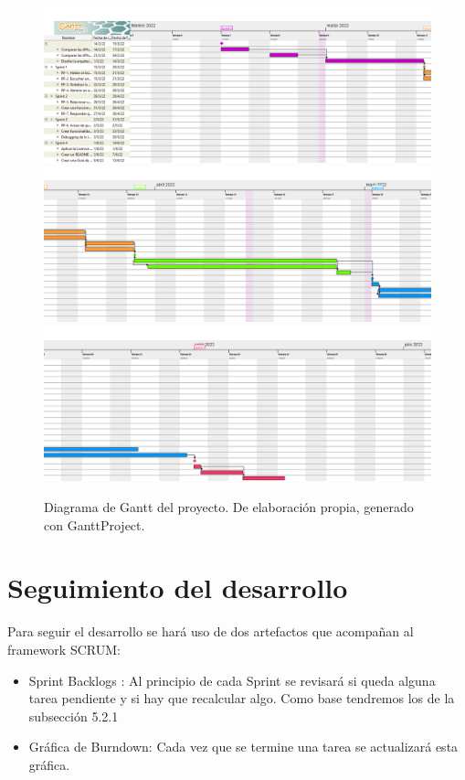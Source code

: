 \begin{figure}[h]
	\centering
	\includegraphics[width=\textwidth]{imagenes/Gantt1.png} \\
	\includegraphics[width=\textwidth]{imagenes/Gantt2.png} \\
	\includegraphics[width=\textwidth]{imagenes/Gantt3.png} \\
	\caption[Diagrama de Gantt]{Diagrama de Gantt del proyecto. De elaboración propia, generado con GanttProject.}
	\label{fig:gantt}
\end{figure}


\section{Seguimiento del desarrollo}
Para seguir el desarrollo se hará uso de dos artefactos que acompañan al framework SCRUM:
\begin{itemize}
	\item Sprint Backlogs : Al principio de cada Sprint se revisará si queda alguna tarea pendiente y si hay que recalcular algo. Como base tendremos los de la subsección 5.2.1
	\item Gráfica de Burndown: Cada vez que se termine una tarea se actualizará esta gráfica.
\end{itemize}

